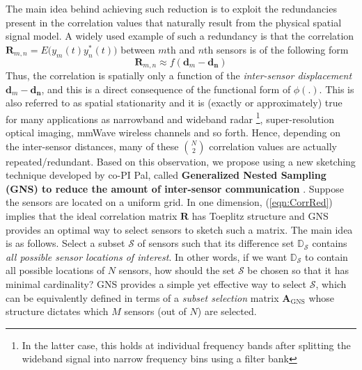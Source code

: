  The main idea behind achieving such reduction is to exploit the redundancies present in the correlation values that naturally result from the physical spatial signal model. A widely used example of such a redundancy is that the correlation $\mathbf{R}_{m,n} = E\Big(y_m(t)y^*_n(t)\Big)$ between $m$th and $n$th sensors is of the following form %
\begin{equation} \mathbf{R}_{m,n} \approx f(\mathbf{d}_m - \mathbf{d_n}) \label{eqn:CorrRed} \end{equation}
Thus, the correlation is spatially only a function of the {\em inter-sensor displacement $\mathbf{d}_m - \mathbf{d_n}$}, and this is a direct consequence of the functional form of $\phi(.)$. This is also referred to as spatial stationarity and it is (exactly or approximately) true for many applications as narrowband and wideband radar \footnote{In the latter case, this holds at individual frequency bands after splitting the wideband signal into narrow frequency bins using a filter bank}, super-resolution optical imaging, mmWave wireless channels %
and so forth. Hence, depending on the inter-sensor distances, many of these $N\choose 2$ correlation values are actually repeated/redundant. Based on this observation, we propose using a new sketching technique developed by co-PI Pal, called {\bf Generalized Nested Sampling (GNS) to reduce the amount of inter-sensor communication} \cite{HP_letter,HP_GNS}. Suppose the sensors are located on a uniform grid. In one dimension, (\ref{eqn:CorrRed}) implies that the ideal correlation matrix $\mathbf{R}$ has Toeplitz structure and GNS provides an optimal way to select sensors to sketch such a matrix. The main idea is as follows. Select a subset $\mathcal{S}$ of sensors such that its difference set $\mathbb{D}_{\mathcal{S}}$ contains {\em all possible sensor locations of interest}. In other words, if we want $\mathbb{D}_{\mathcal{S}}$ to contain all possible locations of $N$ sensors, how should the set $\mathcal{S}$ be chosen so that it has minimal cardinality? GNS provides a simple yet effective way to select $\mathcal{S}$, which can be equivalently defined in terms of a {\em subset selection} matrix $\mathbf{A}_{\text{GNS}}$ whose structure dictates which $M$ sensors (out of $N$) are selected. %

